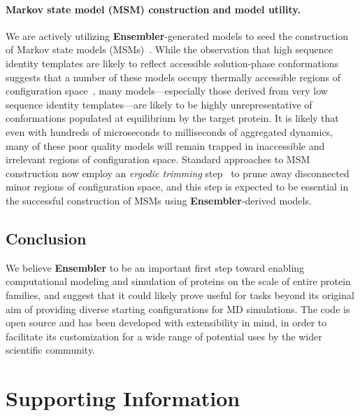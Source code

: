 \documentclass[10pt,letterpaper]{article}
\begin{document}
\paragraph{Markov state model (MSM) construction and model utility.}
We are actively utilizing {\bf Ensembler}-generated models to seed the construction of Markov state models (MSMs)~\cite{pande-beauchamp-bowman:2010:methods:markov-model-review,chodera-noe:curr-opin-struct-biol:2014:msm-review}.
While the observation that high sequence identity templates are likely to reflect accessible solution-phase conformations suggests that a number of these models occupy thermally accessible regions of configuration space~\cite{friedland:plos-comput-biol:2009:conformational-dynamics}, many models---especially those derived from very low sequence identity templates---are likely to be highly unrepresentative of conformations populated at equilibrium by the target protein.
It is likely that even with hundreds of microseconds to milliseconds of aggregated dynamics, many of these poor quality models will remain trapped in inaccessible and irrelevant regions of configuration space.
Standard approaches to MSM construction now employ an \emph{ergodic trimming} step~\cite{caflisch:jpcb:2011:msm-subgraph,msmbuilder} to prune away disconnected minor regions of configuration space, and this step is expected to be essential in the successful construction of MSMs using {\bf Ensembler}-derived models.

\subsection*{Conclusion}

We believe {\bf Ensembler} to be an important first step toward enabling computational modeling and simulation of proteins on the scale of entire protein families, and suggest that it could likely prove useful for tasks beyond its original aim of providing diverse starting configurations for MD simulations.
The code is open source and has been developed with extensibility in mind, in order to facilitate its customization for a wide range of potential uses by the wider scientific community.


\section*{Supporting Information}
\end{document}
